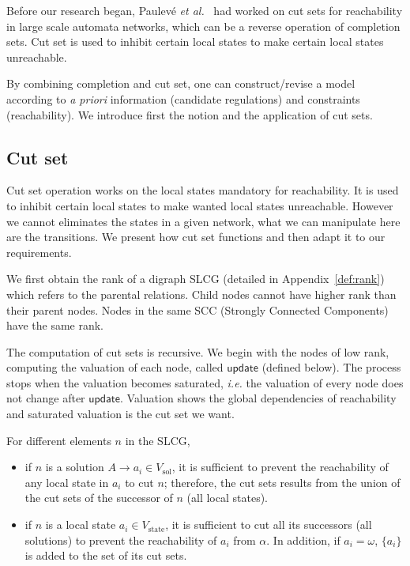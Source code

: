 Before our research began, Paulev\'e \textit{et al.}~\cite{PAK13-CAV} had worked on cut sets for reachability in large scale automata networks, which can be a reverse operation of completion sets.
Cut set is used to inhibit certain local states to make certain local states unreachable.

By combining completion and cut set, one can construct/revise a model according to \textit{a priori} information (candidate regulations) and constraints (reachability).
We introduce first the notion and the application of cut sets.

\subsection{Cut set}\label{sec:cutsetModelInfer}

Cut set operation works on the local states mandatory  %
for reachability. 
It is used to inhibit certain local states to make wanted local states unreachable.
However we cannot eliminates the states in a given network, what we can manipulate here are the transitions. 
We present how cut set functions and then adapt it to our requirements.

We first obtain the rank of a digraph SLCG (detailed in Appendix~\ref{def:rank}) which refers to the parental relations.
Child nodes cannot have higher rank than their parent nodes.
Nodes in the same SCC (Strongly Connected Components) have the same rank.

The computation of cut sets is recursive.
We begin with the nodes of low rank, computing the valuation of each node, called $\mathsf{update}$ (defined below).
The process stops when the valuation becomes saturated, \textit{i.e.} the valuation of every node does not change after $\mathsf{update}$.
Valuation shows the global dependencies of reachability and saturated valuation is the cut set we want.

For different elements $n$ in the SLCG,  

\begin{itemize}
\item if $n$ is a solution $A\to a_i \in V_{\mathrm{sol}}$, it is sufficient to prevent the reachability of any local state in $a_i$ to cut $n$; therefore, the cut sets results from the union
of the cut sets of the successor of $n$ (all local states).
\item if $n$ is a local state $a_i\in V_{\mathrm{state}}$, it is sufficient to cut all its successors (all solutions) to prevent the reachability of $a_i$ from $\alpha$. 
In addition, if $a_i=\omega$, $\{a_i\}$ is added to the set of its cut sets.
\end{itemize}

